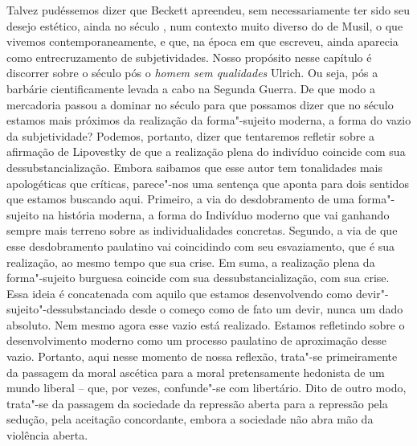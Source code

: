 Talvez pudéssemos dizer que Beckett apreendeu, sem necessariamente ter
sido seu desejo estético, ainda no século , num contexto muito diverso
do de Musil, o que vivemos contemporaneamente, e que, na época em que
escreveu, ainda aparecia como entrecruzamento de subjetividades. Nosso
propósito nesse capítulo é discorrer sobre o século  pós o \emph{homem
sem qualidades} Ulrich. Ou seja, pós a barbárie cientificamente levada a
cabo na Segunda Guerra. De que modo a mercadoria passou a dominar no
século  para que possamos dizer que no século  estamos mais
próximos da realização da forma"-sujeito moderna, a forma do vazio da
subjetividade? Podemos, portanto, dizer que tentaremos refletir sobre a
afirmação de Lipovestky de que a realização plena do indivíduo coincide
com sua dessubstancialização. Embora saibamos que esse autor tem
tonalidades mais apologéticas que críticas, parece"-nos uma sentença que
aponta para dois sentidos que estamos buscando aqui. Primeiro, a via do
desdobramento de uma forma"-sujeito na história moderna, a forma do
Indivíduo moderno que vai ganhando sempre mais terreno sobre as
individualidades concretas. Segundo, a via de que esse desdobramento
paulatino vai coincidindo com seu esvaziamento, que é sua realização, ao
mesmo tempo que sua crise. Em suma, a realização plena da forma"-sujeito
burguesa coincide com sua dessubstancialização, com sua crise. Essa
ideia é concatenada com aquilo que estamos desenvolvendo como
devir"-sujeito"-dessubstanciado desde o começo como de fato um devir,
nunca um dado absoluto. Nem mesmo agora esse vazio está realizado.
Estamos refletindo sobre o desenvolvimento moderno como um processo
paulatino de aproximação desse vazio. Portanto, aqui nesse momento de
nossa reflexão, trata"-se primeiramente da passagem da moral ascética
para a moral pretensamente hedonista de um mundo liberal -- que, por
vezes, confunde"-se com libertário. Dito de outro modo, trata"-se da
passagem da sociedade da repressão aberta para a repressão pela sedução,
pela aceitação concordante, embora a sociedade não abra mão da violência
aberta.

